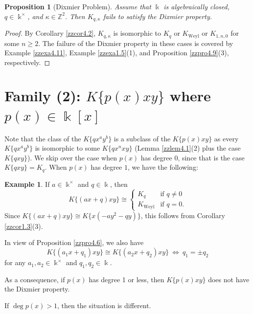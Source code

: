 \documentclass[12pt]{amsart}
\theoremstyle{plain}
\newtheorem{proposition}[theorem]{Proposition}
\numberwithin{theorem}{section}
\numberwithin{equation}{theorem}
\theoremstyle{definition}
\newtheorem{example}[theorem]{Example}
\newcommand{\ZZ}{\mathbb{Z}}
\DeclareMathOperator{\Weyl}{Weyl}
\newcommand \Kweyl {K_{\Weyl}}
\newcommand \kx {\Bbbk^\times}
\begin{document}
\begin{proposition}[Dixmier Problem]  \label{zzpro4.12}
Assume that $\Bbbk$ is algebraically closed, $q \in \kx$, and $\kappa \in \ZZ^2$.  Then $K_{q,\kappa}$ fails to satisfy the Dixmier property.
\end{proposition}

\begin{proof} 
By Corollary \ref{zzcor4.2}, $K_{q,\kappa}$ is isomorphic to $K_q$ or $\Kweyl$ or $K_{1,n,0}$ for some $n \ge 2$.  The failure of the Dixmier property in these cases is covered by Example \ref{zzexa4.11}, Example \ref{zzexa1.5}(1), and Proposition \ref{zzpro4.9}(3), respectively.
\end{proof}


\section{Family (2): $K\{p(x)xy\}$ where $p(x)\in \Bbbk[x]$}
\label{zzsec5}

Note that the class of the $K\{q x^a y^b\}$ 
is a subclass of the $K\{p(x)xy\}$
as every $K\{q x^a y^b\}$ is isomorphic 
to some $K\{q x^{n} xy\}$ 
(Lemma \ref{zzlem4.1}(2) plus the case 
$K\{qxy\}$). We skip over the case when 
$p(x)$ has degree $0$, since that is the 
case $K\{qxy\} = K_q$. When $p(x)$ has 
degree $1$, we have the following:

\begin{example}
\label{zzexa5.1}
If $a \in \kx$ and $q\in \Bbbk$, then 
$$K\{(ax+q)xy\} \cong 
\begin{cases} K_q & {\text{if $q\neq 0$}}\\
\Kweyl & {\text{if $q=0$.}}
\end{cases}
$$
Since $K\{(ax+q)xy\} \cong K\{x(-ay^2-qy)\}$, this follows from Corollary \ref{zzcor1.3}(3).

In view of Proposition \ref{zzpro4.6}, we also have
$$K\{(a_1x+q_1)xy\} \cong K\{(a_2x+q_2)xy\} \ \iff \ q_1 = \pm q_2$$
for any $a_1,a_2 \in \kx$ and $q_1,q_2 \in \Bbbk$.
\end{example}

As a consequence, if $p(x)$ has degree 1 or less, then $K\{ p(x)xy\}$
does not have the Dixmier property.

If $\deg p(x)>1$, then the situation is different. 
\end{document}
